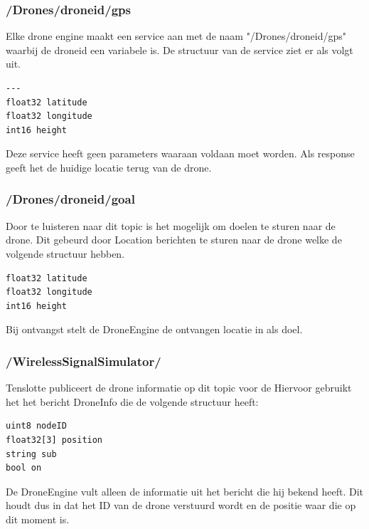 \documentclass[a4paper, 11pt, oneside]{report}
\begin{document}
\subsubsection{/Drones/drone\textunderscore id/gps}
\label{DetailedDesign:MeshNetwerk:interfaces:requestgps}

Elke drone engine maakt een service aan met de naam "\slash Drones/drone\textunderscore id/gps"	waarbij de drone\textunderscore id een variabele is.
De structuur van de service ziet er als volgt uit.
\begin{lstlisting}
---
float32 latitude
float32 longitude
int16 height
\end{lstlisting}

Deze service heeft geen parameters waaraan voldaan moet worden. 
Als response geeft het de huidige locatie terug van de drone.

\subsubsection{/Drones/drone\textunderscore id/goal}
\label{DetailedDesign:MeshNetwerk:interfaces:location}

Door te luisteren naar dit topic is het mogelijk om doelen te sturen naar de drone. 
Dit gebeurd door Location berichten te sturen naar de drone welke de volgende structuur hebben.

\begin{lstlisting}
float32 latitude
float32 longitude
int16 height
\end{lstlisting}

Bij ontvangst stelt de DroneEngine de ontvangen locatie in als doel.

\subsubsection{\slash WirelessSignalSimulator\slash}
\label{DetailedDesign:MeshNetwerk:interfaces:droneinfo}
Tenslotte publiceert de drone informatie op dit topic voor de 
Hiervoor gebruikt het het bericht DroneInfo die de volgende structuur heeft:

\begin{lstlisting}
uint8 nodeID
float32[3] position
string sub
bool on
\end{lstlisting}

De DroneEngine vult alleen de informatie uit het bericht die hij bekend heeft.
Dit houdt dus in dat het ID van de drone verstuurd wordt en de positie waar die op dit moment is.
\end{document}
